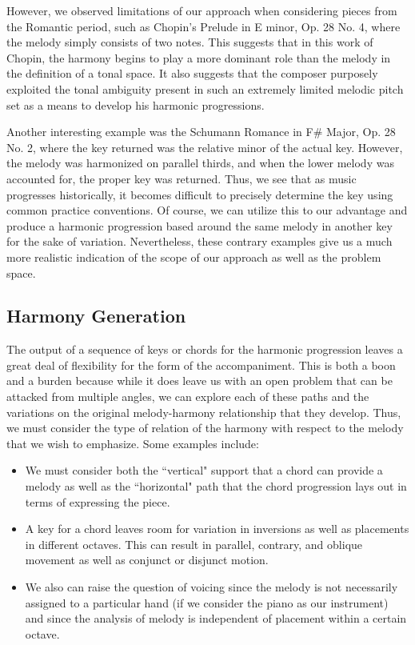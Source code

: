 \documentclass[11pt]{article}
\begin{document}
However, we observed limitations of our approach when considering pieces from the Romantic period, such as Chopin's Prelude in E minor, Op. 28 No. 4, where the melody simply consists of two notes. This suggests that in this work of Chopin, the harmony begins to play a more dominant role than the melody in  the definition of a tonal space.  It also suggests that the composer purposely exploited the tonal ambiguity  present in such an extremely limited melodic pitch set as a means to develop his harmonic progressions.

Another interesting example was the Schumann Romance in F\# Major, Op. 28 No. 2, where the key returned was the relative minor of the actual key. However, the melody was harmonized on parallel thirds, and when the lower melody was accounted for, the proper key was returned. Thus, we see that as music progresses historically, it becomes difficult to precisely determine the key using common practice conventions. Of course, we can utilize this to our advantage and produce a harmonic progression based around the same melody in another key for the sake of variation. Nevertheless, these contrary examples give us a much more realistic indication of the scope of our approach as well as the problem space.

\subsection{Harmony Generation}

The output of a sequence of keys or chords for the harmonic progression leaves a great deal of flexibility for the form of the accompaniment. This is both a boon and a burden because while it does leave us with an open problem that can be attacked from multiple angles, we can explore each of these paths and the variations on the original melody-harmony relationship that they develop. Thus, we must consider the type of relation of the harmony with respect to the melody that we wish to emphasize. Some examples include:

\begin{itemize}
\item We must consider both the ``vertical" support that a chord can provide a melody as well as the ``horizontal" path that the chord progression lays out in terms of expressing the piece.
\item A key for a chord leaves room for variation in inversions as well as placements in different octaves. This can result in parallel, contrary, and oblique movement as well as conjunct or disjunct motion.
\item We also can raise the question of voicing since the melody is not necessarily assigned to a particular hand (if we consider the piano as our instrument) and since the analysis of melody is independent of placement within a certain octave.
\end{itemize}
\end{document}
